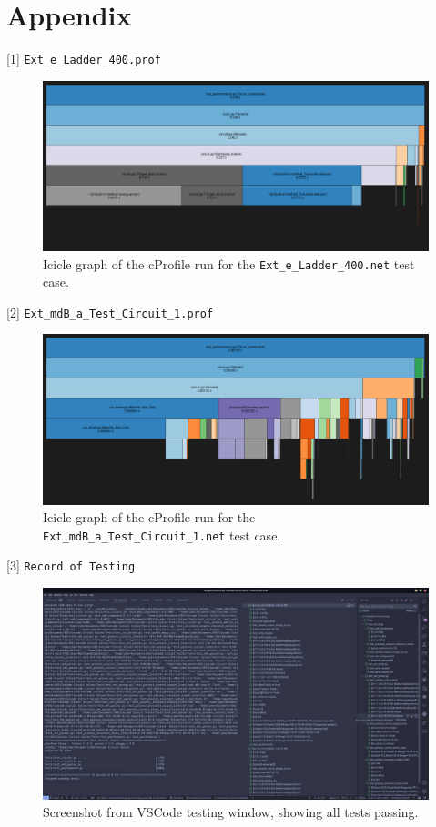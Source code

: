 \documentclass[conference]{IEEEtran}
\begin{document}
\onecolumn
\section{Appendix}

 [1] \texttt{Ext\_e\_Ladder\_400.prof}
\begin{figure}[ht]
      \centering
      \includegraphics[width=\linewidth]{Images/Ext_e_Ladder_400.prof.png}
      \caption{Icicle graph of the cProfile run for the \texttt{Ext\_e\_Ladder\_400.net} test case.}
      \label{fig:ext_e_ladder_400}
\end{figure}


[2] \texttt{Ext\_mdB\_a\_Test\_Circuit\_1.prof}
\begin{figure}[ht]
      \centering
      \includegraphics[width=\linewidth]{Images/Ext_mdB_a_Test_Circuit_1.prof.png}
      \caption{Icicle graph of the cProfile run for the \texttt{Ext\_mdB\_a\_Test\_Circuit\_1.net} test case.}
      \label{fig:ext_mdb_a_test_circuit_1}
\end{figure}

[3] \texttt{Record of Testing}
\begin{figure}[ht]
      \centering
      \includegraphics[width=\linewidth]{Images/Record of Testing.png}
      \caption{Screenshot from VSCode testing window, showing all tests passing.}
      \label{fig:record_of_testing}
\end{figure}
\end{document}
